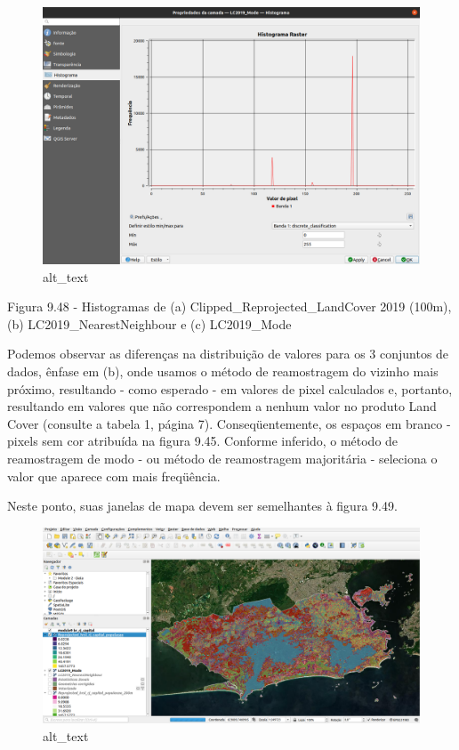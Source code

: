\documentclass[
]{book}
\begin{document}
\begin{figure}
\centering
\includegraphics{media/modulo9/fig948_c.png}
\caption{alt\_text}
\end{figure}

Figura 9.48 - Histogramas de (a) Clipped\_Reprojected\_LandCover 2019 (100m), (b) LC2019\_NearestNeighbour e (c) LC2019\_Mode

Podemos observar as diferenças na distribuição de valores para os 3 conjuntos de dados, ênfase em (b), onde usamos o método de reamostragem do vizinho mais próximo, resultando - como esperado - em valores de pixel calculados e, portanto, resultando em valores que não correspondem a nenhum valor no produto Land Cover (consulte a tabela 1, página 7). Conseqüentemente, os espaços em branco - pixels sem cor atribuída na figura 9.45. Conforme inferido, o método de reamostragem de modo - ou método de reamostragem majoritária - seleciona o valor que aparece com mais freqüência.

Neste ponto, suas janelas de mapa devem ser semelhantes à figura 9.49.

\begin{figure}
\centering
\includegraphics{media/modulo9/fig949.png}
\caption{alt\_text}
\end{figure}
\end{document}
